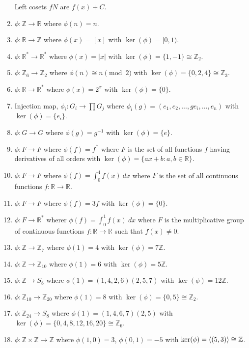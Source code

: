 \begin{enumerate}
	Left cosets $fN$ are $f(x)+C$.
	\item $\phi : \mathbb{Z} \to \mathbb{R}$ where $\phi(n) = n$.
	\item $\phi : \mathbb{R} \to \mathbb{Z}$ where $\phi(x) = [x]$ with $\ker(\phi)=[0,1)$.
	\item $\phi : \mathbb{R}^\ast \to \mathbb{R}^\ast$ where $\phi(x) = |x|$ with $\ker(\phi) = \{1,-1\} \cong \mathbb{Z}_2$.
	\item $\phi : \mathbb{Z}_6 \to \mathbb{Z}_2$ where $\phi(n) \cong n \pmod{2}$ with $\ker(\phi)=\{0,2,4\} \cong \mathbb{Z}_3$.
	\item $\phi : \mathbb{R} \to \mathbb{R}^\ast$ where $\phi(x) = 2^x$ with $\ker(\phi) = \{0\}$.
	\item Injection map, $\phi_i : G_i \to \prod G_j$ where $\phi_i(g)=(e_1,e_2,\dots,ge_i,\dots,e_n)$ with $\ker(\phi)=\{e_i\}$.
	\item $\phi : G \to G$ where $\phi(g) = g^{-1}$ with $\ker(\phi)=\{e\}$.
	\item $\phi : F \to F$ where $\phi(f) = f^{\prime\prime}$ where $F$ is the set of all functions $f$ having derivatives of all orders with $\ker(\phi)=\{ax+b : a,b \in \mathbb{R}\}$.
	\item $\phi : F \to F$ where $\phi(f) = \int_0^4 f(x)\ dx$ where $F$ is the set of all continuous functions $f : \mathbb{R} \to \mathbb{R}$.
	\item $\phi : F \to F$ where $\phi(f) = 3f$ with $\ker(\phi)=\{0\}$.
	\item $\phi : F \to \mathbb{R}^\ast$ wherer $\phi(f) = \int_0^1 f(x)\ dx$ where $F$ is the multiplicative group of continuous functions $f : \mathbb{R} \to \mathbb{R}$ such that $f(x) \ne 0$.
	\item $\phi : \mathbb{Z} \to \mathbb{Z}_7$ where $\phi(1) = 4$ with $\ker(\phi) = 7\mathbb{Z}$.
	\item $\phi : \mathbb{Z} \to \mathbb{Z}_{10}$ where $\phi(1) = 6$ with $\ker(\phi) = 5\mathbb{Z}$.
	\item $\phi : \mathbb{Z} \to S_8$ where $\phi(1) = (1,4,2,6)(2,5,7)$ with $\ker(\phi) = 12\mathbb{Z}$.
	\item $\phi : \mathbb{Z}_{10} \to \mathbb{Z}_{20}$ where $\phi(1) = 8$ with $\ker(\phi) = \{0,5\} \cong \mathbb{Z}_2$.
	\item $\phi : \mathbb{Z}_{24} \to S_8$ where $\phi(1) = (1,4,6,7)(2,5)$ with $\ker(\phi) = \{0,4,8,12,16,20\} \cong \mathbb{Z}_6$.
	\item $\phi : \mathbb{Z} \times \mathbb{Z} \to \mathbb{Z}$ where $\phi(1,0)=3$, $\phi(0,1)=-5$ with $\ker(\phi)=\left\langle (5,3) \right\rangle \cong \mathbb{Z}$.

\end{enumerate}
